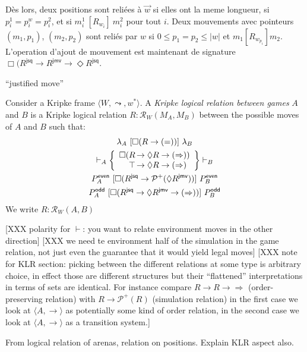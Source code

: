 \documentclass[acmsmall,anonymous]{acmart}
\newcommand{\kw}[1]{\ensuremath{ \textsf{#1} }}
\newcommand{\ifr}[1]{\ [{#1}]\ }
\begin{document}
D\`es lors,
deux positions sont reli\'ees \`a $\vec{w}$
si elles ont la meme longueur,
si $p^1_i = p^w_i = p^2_i$,
et si $m^1_i \ifr{R_{w_i}} m^2_i$
pour tout $i$.
Deux mouvements avec pointeurs $(m_1, p_1)$, $(m_2, p_2)$
sont reli\'es par $w$ si
$0 \le p_1 = p_2 \le |w|$ et
$m_1 [R_{w_{p_1}}] m_2$.
L'operation d'ajout de mouvement
est maintenant de signature $\Box (R^\kw{jsq} \rightarrow R^\kw{jmv} \rightarrow \Diamond R^\kw{jsq}$.

``justified move''

Consider a Kripke frame $\langle W, \leadsto, w^* \rangle$.
A \emph{Kripke logical relation between games} $A$ and $B$
is a Kripke logical relation $R : \mathcal{R}_W(M_A, M_B)$
between the possible moves of $A$ and $B$
such that:
\begin{gather*}
  \lambda_A \ifr{\Box (R \rightarrow (=))} \lambda_B \\
  \vdash_A
      \left\{
      \begin{array}{r@{\,}l}
        \Box(R &\rightarrow \Diamond R \rightarrow (\Rightarrow)) \\
          \top &\rightarrow \Diamond R \rightarrow (\Rightarrow)
      \end{array}
      \right\}
    \vdash_B \\
  P_A^\kw{even}
    \ifr{\Box (R^\kw{jsq} \rightarrow \mathcal{P}^+(\Diamond R^\kw{jmv}))}
      P_B^\kw{even} \\
  P_A^\kw{odd}
    \ifr{\Box (R^\kw{jsq} \rightarrow \Diamond R^\kw{jmv} \rightarrow (\Rightarrow))}
      P_B^\kw{odd}
\end{gather*}
We write $R : \mathcal{R}_W(A, B)$

[XXX polarity for $\vdash$: you want to relate environment moves
in the other direction]
[XXX we need te environment half of the simulation
in the game relation, not just even the guarantee that it would yield
legal moves]
[XXX note for KLR section: picking between
the different relations at some type is arbitrary choice,
in effect those are different structures
but their ``flattened'' interpretations in terms of sets are identical.
For instance compare $R \rightarrow R \rightarrow \Rightarrow$
(order-preserving relation)
with $R \rightarrow \mathcal{P}^+(R)$
(simulation relation)
in the first case we look at $\langle A, \rightarrow \rangle$
as potentially some kind of order relation,
in the second case we look at $\langle A, \rightarrow \rangle$
as a transition system.]

From logical relation of arenas, relation on positions.
Explain KLR aspect also.
\end{document}
